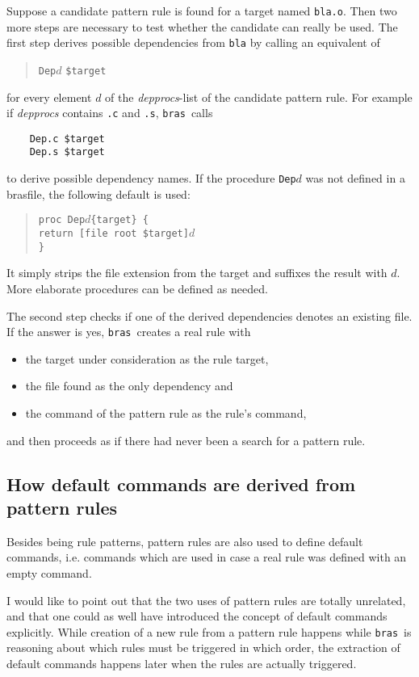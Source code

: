 \documentclass[12pt]{article}
\newcommand{\bras}{\texttt{bras}}
\begin{document}
Suppose a candidate pattern rule is found for a target named
\texttt{bla.o}. Then two more steps are necessary
to test whether the candidate can really be used.
The first step derives possible dependencies
from \texttt{bla} by calling
an equivalent of
\begin{quote}
    \texttt{Dep}$d$ \texttt{\$target}
\end{quote}
for every element $d$ of the \textit{depprocs}-list of the candidate
pattern rule. For example if \textit{depprocs} contains \texttt{.c}
and \texttt{.s}, \bras\ calls
\begin{verbatim}
    Dep.c $target
    Dep.s $target
\end{verbatim}
to derive possible dependency names. If the procedure \texttt{Dep$d$}
was not defined in a brasfile, the following
default is used:
\begin{quote}
    \verb|proc Dep|$d$\verb|{target} {|\\
    \texttt{\hspace*{2em}return [file root \$target]$d$}\\
    \verb|}|
\end{quote}
It simply strips the file extension from the target and suffixes the
result with $d$. More elaborate
procedures can be defined as needed.

The second step checks if one of
the derived dependencies denotes an existing file.
If the answer is yes, \bras\ creates a real rule with
\begin{itemize}
\item the target under consideration as the rule target,
\item the file found as the only dependency and
\item the command of the pattern rule as the rule's command,
\end{itemize}
and then proceeds as if there had never been a search for a pattern
rule.

\subsection{How default commands are derived from pattern rules}
\label{secSuffixAsDefCmd}
Besides being rule patterns, pattern rules are also used to define
default commands, i.e. commands which are used in case a real rule was
defined with an empty command.

I would like to point out that the two uses of pattern rules are
totally unrelated, and that one could as well have introduced the
concept of default commands explicitly. While creation of a new rule
from a pattern rule happens while \bras\ is reasoning about which rules
must be triggered in which order, the extraction of default commands
happens later when the rules are actually triggered. 
\end{document}
